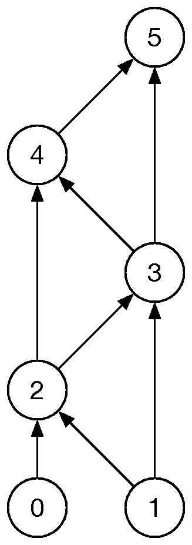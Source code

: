 \begin{frame}[fragile]
\begin{columns}[c]
\begin{column}{0.45\textwidth}
\begin{example}[fib\((5)\)]
\begin{center}
\includegraphics[scale=0.3]{./Figure/elementaryCS-2nd-figFib.eps}
        \end{center}
      \end{example}
    \end{column}
  \end{columns}
\end{frame}
